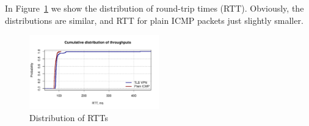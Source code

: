 In Figure~\ref{fig:rtt} we show the distribution of round-trip times
(RTT). Obviously, the distributions are similar, and RTT for
plain ICMP packets just slightly smaller.

\begin{figure}[!h]
        \includegraphics[width=0.5\textwidth]{graphics/rtt.pdf}
        \caption{Distribution of RTTs}
        \label{fig:rtt}
\end{figure}